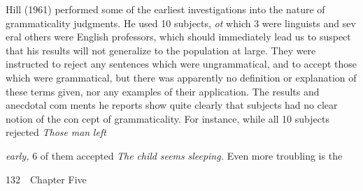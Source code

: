 \begin{styleTextbody}
Hill (1961) performed some of the earliest investigations into the nature of grammaticality judgments. He used 10 subjects, \textit{ot}\textit{ }which 3 were linguists and sev\- eral others were English professors, which should immediately lead us to suspect that his results will not generalize to the population at large. They were instructed to {\textquotedbl}reject any sentences which were ungrammatical, and to accept those which were grammatical,{\textquotedbl} but there was apparently no definition or explanation of these terms given, nor any examples of their application. The results and anecdotal com\- ments he reports show quite clearly that subjects had no clear notion of the con\- cept of grammaticality. For instance, while all 10 subjects rejected \textit{Those}\textit{ }\textit{man}\textit{ }\textit{left}
\end{styleTextbody}


\begin{styleStandard}
\textit{early,}\textit{ }6 of them accepted \textit{The}\textit{ }\textit{child}\textit{ }\textit{seems}\textit{ }\textit{sleeping.}\textit{ }Even more troubling is the
\end{styleStandard}


\clearpage\setcounter{page}{1}\begin{styleStandard}
132\ \ Chapter Five
\end{styleStandard}



